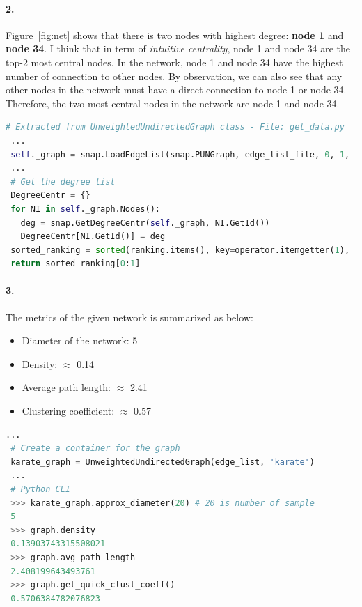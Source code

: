 \documentclass[a4paper,12pt]{article}
\begin{document}
\paragraph{2.} Figure~\ref{fig:net} shows that there is two nodes with highest degree: \textbf{node 1} and \textbf{node 34}. I think that in term of \emph{intuitive centrality}, node 1 and node 34 are the top-2 most central nodes. In the network, node 1 and node 34 have the highest number of connection to other nodes. By observation, we can also see that any other nodes in the network must have a direct connection to node 1 or node 34. Therefore, the two most central nodes in the
network are node 1 and node 34. 

\begin{lstlisting}[language=Python, caption={Create the graph in SNAP.PY and print top-k highest degree centrality node.}]
 # Extracted from UnweightedUndirectedGraph class - File: get_data.py
 ...
 self._graph = snap.LoadEdgeList(snap.PUNGraph, edge_list_file, 0, 1, ' ')
 ...
 # Get the degree list 
 DegreeCentr = {}
 for NI in self._graph.Nodes():
   deg = snap.GetDegreeCentr(self._graph, NI.GetId())
   DegreeCentr[NI.GetId()] = deg
 sorted_ranking = sorted(ranking.items(), key=operator.itemgetter(1), reverse=True)
 return sorted_ranking[0:1]
\end{lstlisting}

\paragraph{3.} The metrics of the given network is summarized as below: \cite{mgit}
\begin{itemize}
        \setlength{\parskip}{0cm}
    \item Diameter of the network: 5
    \item Density: $\approx$ 0.14
    \item Average path length: $\approx$ 2.41
    \item Clustering coefficient: $\approx$ 0.57
\end{itemize}

\begin{lstlisting}[language=Python, caption={Graph metrics properties in SNAP.PY}]
 ...
 # Create a container for the graph
 karate_graph = UnweightedUndirectedGraph(edge_list, 'karate')
 ...
 # Python CLI 
 >>> karate_graph.approx_diameter(20) # 20 is number of sample
 5
 >>> graph.density 
 0.13903743315508021
 >>> graph.avg_path_length
 2.408199643493761
 >>> graph.get_quick_clust_coeff()
 0.5706384782076823
\end{lstlisting}
\end{document}
